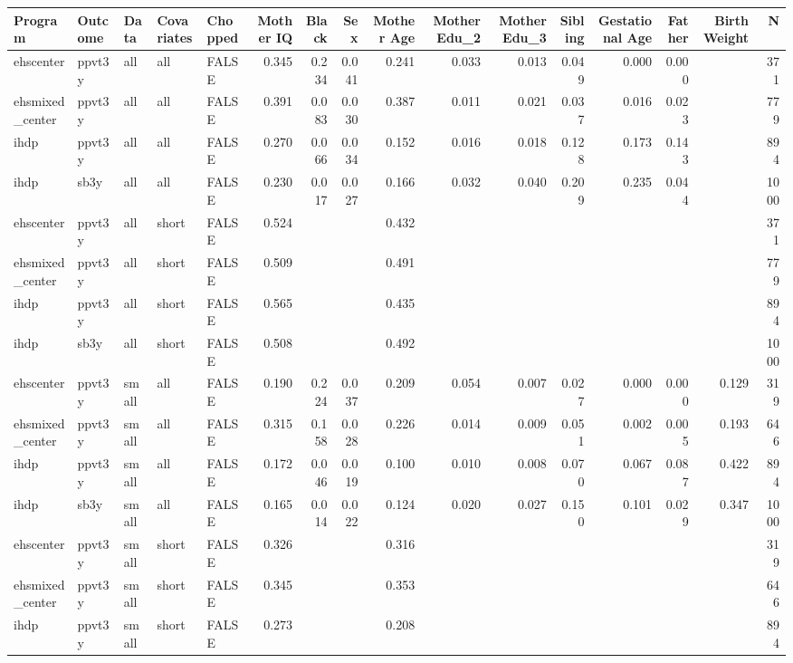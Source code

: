 \begin{table}[ht]
\centering
\begin{tabular}{lllllrrrrrrrrrrr}
  \hline
Program & Outcome & Data & Covariates & Chopped & Mother IQ & Black & Sex & Mother Age & Mother Edu\_2 & Mother Edu\_3 & Sibling & Gestational Age & Father & Birth Weight & N \\ 
  \hline
ehscenter & ppvt3y & all & all & FALSE & 0.345 & 0.234 & 0.041 & 0.241 & 0.033 & 0.013 & 0.049 & 0.000 & 0.000 &  & 371 \\ 
  ehsmixed\_center & ppvt3y & all & all & FALSE & 0.391 & 0.083 & 0.030 & 0.387 & 0.011 & 0.021 & 0.037 & 0.016 & 0.023 &  & 779 \\ 
  ihdp & ppvt3y & all & all & FALSE & 0.270 & 0.066 & 0.034 & 0.152 & 0.016 & 0.018 & 0.128 & 0.173 & 0.143 &  & 894 \\ 
  ihdp & sb3y & all & all & FALSE & 0.230 & 0.017 & 0.027 & 0.166 & 0.032 & 0.040 & 0.209 & 0.235 & 0.044 &  & 1000 \\ 
  ehscenter & ppvt3y & all & short & FALSE & 0.524 &  &  & 0.432 &  &  &  &  &  &  & 371 \\ 
  ehsmixed\_center & ppvt3y & all & short & FALSE & 0.509 &  &  & 0.491 &  &  &  &  &  &  & 779 \\ 
  ihdp & ppvt3y & all & short & FALSE & 0.565 &  &  & 0.435 &  &  &  &  &  &  & 894 \\ 
  ihdp & sb3y & all & short & FALSE & 0.508 &  &  & 0.492 &  &  &  &  &  &  & 1000 \\ 
  ehscenter & ppvt3y & small & all & FALSE & 0.190 & 0.224 & 0.037 & 0.209 & 0.054 & 0.007 & 0.027 & 0.000 & 0.000 & 0.129 & 319 \\ 
  ehsmixed\_center & ppvt3y & small & all & FALSE & 0.315 & 0.158 & 0.028 & 0.226 & 0.014 & 0.009 & 0.051 & 0.002 & 0.005 & 0.193 & 646 \\ 
  ihdp & ppvt3y & small & all & FALSE & 0.172 & 0.046 & 0.019 & 0.100 & 0.010 & 0.008 & 0.070 & 0.067 & 0.087 & 0.422 & 894 \\ 
  ihdp & sb3y & small & all & FALSE & 0.165 & 0.014 & 0.022 & 0.124 & 0.020 & 0.027 & 0.150 & 0.101 & 0.029 & 0.347 & 1000 \\ 
  ehscenter & ppvt3y & small & short & FALSE & 0.326 &  &  & 0.316 &  &  &  &  &  &  & 319 \\ 
  ehsmixed\_center & ppvt3y & small & short & FALSE & 0.345 &  &  & 0.353 &  &  &  &  &  &  & 646 \\ 
  ihdp & ppvt3y & small & short & FALSE & 0.273 &  &  & 0.208 &  &  &  &  &  &  & 894 \\ 

\end{tabular}
\end{table}
